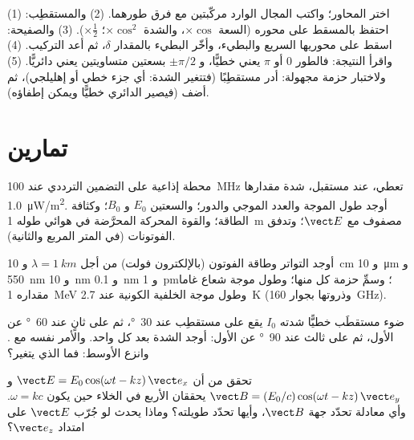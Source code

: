 \begin{method}\label{met:b2:plane-waves-polarization:method}
(1) اختر المحاور؛ واكتب المجال الوارد مركّبتين مع
فرق طورهما. (2) والمستقطِب: احتفظ بالمسقط على
محوره (السعة $\times\cos$، والشدة $\times\cos^2$؛ 
$\times\tfrac12$). (3) والصفيحة: اسقط على محوريها السريع والبطيء، وأخّر
البطيء بالمقدار $\delta$، ثم أعد التركيب. (4) واقرأ النتيجة: فالطور $0$ أو $\pi$
يعني خطيًّا، و $\pm\pi/2$ بسعتين متساويتين يعني دائريًّا. (5) ولاختبار
حزمة مجهولة: أدر مستقطِبًا (فتتغير الشدة: أي جزء خطي أو
إهليلجي)، ثم أضف  (فيصير الدائري
خطيًّا ويمكن إطفاؤه).
\end{method}

\section{تمارين}

\begin{exercise}[$\star$]\label{exo:b2:plane-waves-polarization:1}
محطة إذاعية على التضمين الترددي عند \qty{100}{MHz} تعطي، عند مستقبل، شدة مقدارها
\qty{1.0}{\micro W/m^2}. أوجد طول الموجة والعدد الموجي والدور؛ والسعتين $E_0$ و
$B_0$؛ وكثافة الطاقة؛ والقوة المحركة المحرَّضة في هوائي طوله \qty{1}{m} مصفوف مع
$\vect E$؛ وتدفق الفوتونات (في المتر المربع والثانية).
\end{exercise}

\begin{exercise}[$\star$]\label{exo:b2:plane-waves-polarization:2}
أوجد التواتر وطاقة الفوتون (بالإلكترون فولت) من أجل $\lambda = \qty{1}{km}$ و \qty{10}{cm}
و \qty{10}{\micro m} و \qty{550}{nm} و \qty{10}{nm} و \qty{0.1}{nm} و \qty{1}{pm}؛ وسمِّ
حزمة كل منها؛ وطول موجة شعاع غاما مقداره \qty{1}{MeV} وطول موجة
الخلفية الكونية عند \qty{2.7}{K} (وذروتها بجوار \qty{160}{GHz}).
\end{exercise}

\begin{exercise}[$\star$]\label{exo:b2:plane-waves-polarization:3}
ضوء مستقطَب خطيًّا شدته $I_0$ يقع على مستقطِب عند
\qty{30}{\degree}، ثم على ثانٍ عند \qty{60}{\degree} عن الأول، ثم على
ثالث عند \qty{90}{\degree} عن الأول: أوجد الشدة بعد كل واحد. والأمر نفسه مع
. وانزع الأوسط: فما الذي يتغير؟
\end{exercise}

\begin{exercise}[$\star$]\label{exo:b2:plane-waves-polarization:4}
تحقق من أن $\vect E = E_0\cos(\omega t - kz)\,\vect e_x$ و $\vect B = (E_0/c)\cos(\omega t
- kz)\,\vect e_y$ يحققان  الأربع في الخلاء حين يكون $\omega =
kc$. وأي معادلة تحدّد جهة $\vect B$، وأيها تحدّد
طويلته؟ وماذا يحدث لو جُرّب $\vect E$ على امتداد $\vect e_z$؟
\end{exercise}

